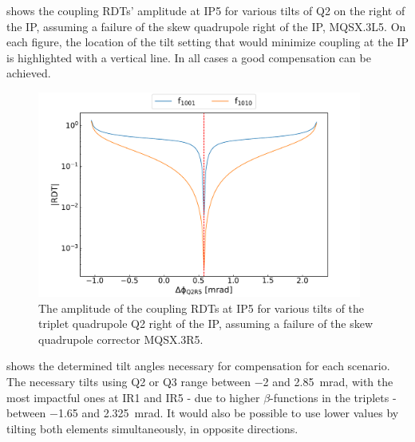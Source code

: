  shows the coupling RDTs' amplitude at IP\num{5} for various tilts of Q\num{2} on the right of the IP, assuming a failure of the skew quadrupole right of the IP, MQSX.\num{3}L\num{5}.
On each figure, the location of the tilt setting that would minimize coupling at the IP is highlighted with a vertical line.
In all cases a good compensation can be achieved.

\begin{figure}[!htb]
    \centering
    \includegraphics*[width=0.95\textwidth]{Figures/IR_Coupling_Correction/ir5_compensate_right_with_q2.pdf}
    \caption{The amplitude of the coupling RDTs at IP\num{5} for various tilts of the triplet quadrupole Q\num{2} right of the IP, assuming a failure of the skew quadrupole corrector MQSX.\num{3}R\num{5}.}
    \label{figure:ir5_compensate_right_with_q2}
\end{figure}

 shows the determined tilt angles necessary for compensation for each scenario.
The necessary tilts using Q\num{2} or Q\num{3} range between \num{-2} and \qty{2.85}{\milli\radian}, with the most impactful ones at IR\num{1} and IR\num{5} - due to higher \(\beta\)-functions in the triplets - between \num{-1.65} and \qty{2.325}{\milli\radian}.
It would also be possible to use lower values by tilting both elements simultaneously, in opposite directions.

